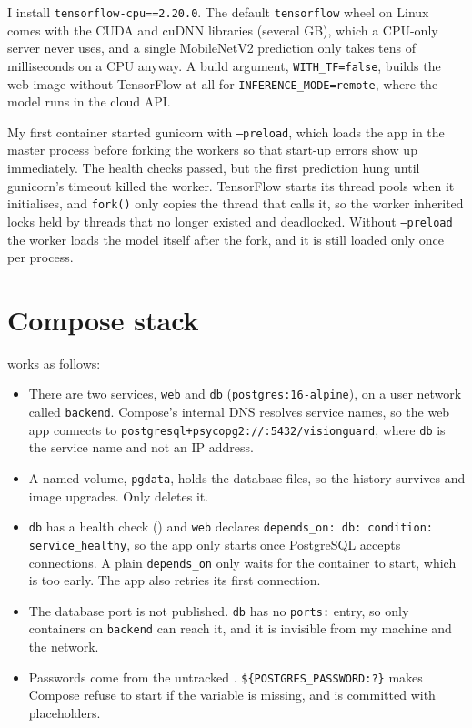 I install \texttt{tensorflow-cpu==2.20.0}. The default \texttt{tensorflow} wheel on Linux comes
with the CUDA and cuDNN libraries (several GB), which a CPU-only server never uses, and a single
MobileNetV2 prediction only takes tens of milliseconds on a CPU anyway. A build argument,
\texttt{WITH\_TF=false}, builds the web image without TensorFlow at all for
\texttt{INFERENCE\_MODE=remote}, where the model runs in the cloud API.


My first container started gunicorn with \texttt{--preload}, which loads the app in the master
process before forking the workers so that start-up errors show up immediately. The health checks
passed, but the first prediction hung until gunicorn's timeout killed the worker. TensorFlow starts
its thread pools when it initialises, and \texttt{fork()} only copies the thread that calls it, so
the worker inherited locks held by threads that no longer existed and deadlocked. Without
\texttt{--preload} the worker loads the model itself after the fork, and it is still loaded only
once per process.

\section{Compose stack}\label{sec:6-3}
\href{\GitHubURL/blob/main/docker-compose.yml}{} works as follows:
\begin{itemize}
\item There are two services, \texttt{web} and \texttt{db} (\texttt{postgres:16-alpine}), on a user
network called \texttt{backend}. Compose's internal DNS resolves service names, so the web app
connects to \texttt{postgresql+psycopg2://\ldots@db:5432/visionguard}, where \texttt{db} is the
service name and not an IP address.
\item A named volume, \texttt{pgdata}, holds the database files, so the history survives
 and image upgrades. Only  deletes it.
\item \texttt{db} has a health check () and \texttt{web} declares
\texttt{depends\_on: db: condition: service\_healthy}, so the app only starts once PostgreSQL
accepts connections. A plain \texttt{depends\_on} only waits for the container to start, which is
too early. The app also retries its first connection.
\item The database port is not published. \texttt{db} has no \texttt{ports:} entry, so only
containers on \texttt{backend} can reach it, and it is invisible from my machine and the network.
\item Passwords come from the untracked . \texttt{\$\{POSTGRES\_PASSWORD:?\}} makes
Compose refuse to start if the variable is missing, and  is committed with
placeholders.
\end{itemize}

